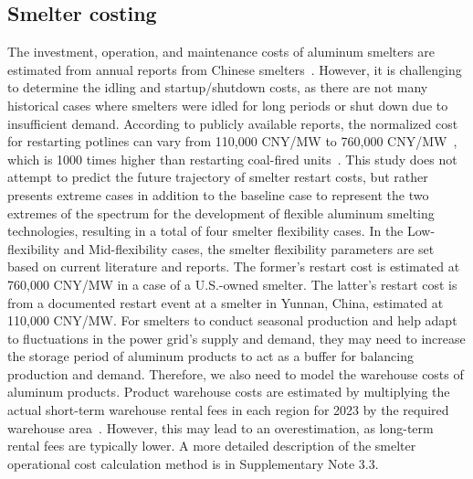 \documentclass[preprint]{elsarticle}
\begin{document}
\subsection*{Smelter costing}
The investment, operation, and maintenance costs of aluminum smelters are estimated from annual reports from Chinese smelters~\citep{CHALCO2020AnnualReport}. However, it is challenging to determine the idling and startup/shutdown costs, as there are not many historical cases where smelters were idled for long periods or shut down due to insufficient demand. According to publicly available reports, the normalized cost for restarting potlines can vary from 110,000 CNY/MW to 760,000 CNY/MW~\citep{Hu2009, noauthor_high_2020,noauthor_alcoa_2021}, which is 1000 times higher than restarting coal-fired units~\citep{smith_analysis_2019}. This study does not attempt to predict the future trajectory of smelter restart costs, but rather presents extreme cases in addition to the baseline case to represent the two extremes of the spectrum for the development of flexible aluminum smelting technologies, resulting in a total of four smelter flexibility cases. In the Low-flexibility and Mid-flexibility cases, the smelter flexibility parameters are set based on current literature and reports. The former's restart cost is estimated at 760,000 CNY/MW in a case of a U.S.-owned smelter. The latter's restart cost is from a documented restart event at a smelter in Yunnan, China, estimated at 110,000 CNY/MW. 
For smelters to conduct seasonal production and help adapt to fluctuations in the power grid's supply and demand, they may need to increase the storage period of aluminum products to act as a buffer for balancing production and demand. Therefore, we also need to model the warehouse costs of aluminum products. Product warehouse costs are estimated by multiplying the actual short-term warehouse rental fees in each region for 2023 by the required warehouse area~\citep{Colliers2024Logistics}. However, this may lead to an overestimation, as long-term rental fees are typically lower. A more detailed description of the smelter operational cost calculation method is in Supplementary Note 3.3.
\end{document}
